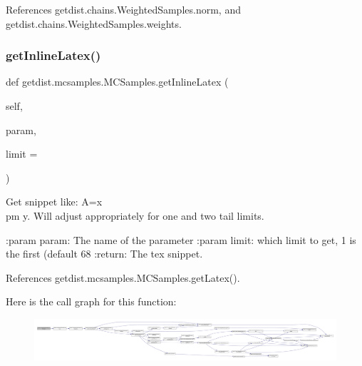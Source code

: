 References getdist.\+chains.\+Weighted\+Samples.\+norm, and getdist.\+chains.\+Weighted\+Samples.\+weights.

\mbox{\label{classgetdist_1_1mcsamples_1_1MCSamples_ad03ae7e378ba02de8fcecb16934b9e65}} 
\subsubsection{\texorpdfstring{get\+Inline\+Latex()}{getInlineLatex()}}
{\footnotesize\ttfamily def getdist.\+mcsamples.\+M\+C\+Samples.\+get\+Inline\+Latex (\begin{DoxyParamCaption}\item[{}]{self,  }\item[{}]{param,  }\item[{}]{limit = {} }\end{DoxyParamCaption})}

\begin{DoxyVerb}Get snippet like: A=x\\pm y. Will adjust appropriately for one and two tail limits.

:param param: The name of the parameter
:param limit: which limit to get, 1 is the first (default 68%
:return: The tex snippet.
\end{DoxyVerb}
 

References getdist.\+mcsamples.\+M\+C\+Samples.\+get\+Latex().

Here is the call graph for this function\+:
\nopagebreak
\begin{figure}[H]
\begin{center}
\leavevmode
\includegraphics[width=350pt]{classgetdist_1_1mcsamples_1_1MCSamples_ad03ae7e378ba02de8fcecb16934b9e65_cgraph}
\end{center}
\end{figure}
\mbox{\label{classgetdist_1_1mcsamples_1_1MCSamples_aa4fc7b33808a24cb90238f2b24500899}} 
